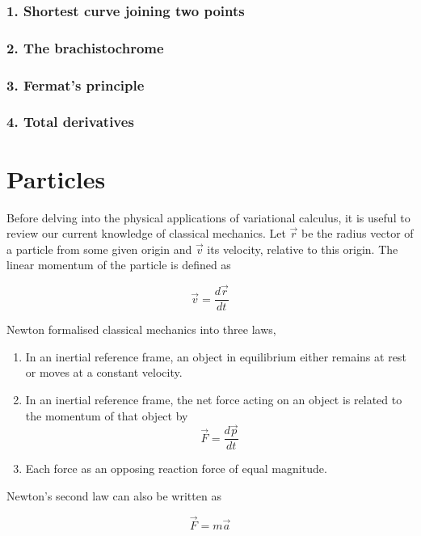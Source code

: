 \documentclass{tufte-book}
\begin{document}
\subsection{1. Shortest curve joining two points}
\subsection{2. The brachistochrome}
\subsection{3. Fermat's principle}
\subsection{4. Total derivatives}

\chapter{Particles}
Before delving into the physical applications of variational calculus, it is useful to review our current knowledge of classical mechanics. Let $\vec{r}$ be the radius vector of a particle from some given origin and $\vec{v}$ its velocity, relative to this origin. The linear momentum of the particle is defined as

\begin{equation}
	\label{eq:12}
	\vec{v} = \frac{d\vec{r}}{dt}
\end{equation}

Newton formalised classical mechanics into three laws,

\begin{enumerate}
	\item In an inertial reference frame, an object in equilibrium either remains at rest or moves at a constant velocity.
	\item In an inertial reference frame, the net force acting on an object is related to the momentum of that object by
	      \begin{equation}
	      	\label{eq:NII}
	      	\vec{F} = \frac{d\vec{p}}{dt}
	      \end{equation}
	\item Each force as an opposing reaction force of equal magnitude.
\end{enumerate}

Newton's second law can also be written as

\begin{equation}
	\label{eq:13}
	\vec{F} = m\vec{a}
\end{equation}
\end{document}
